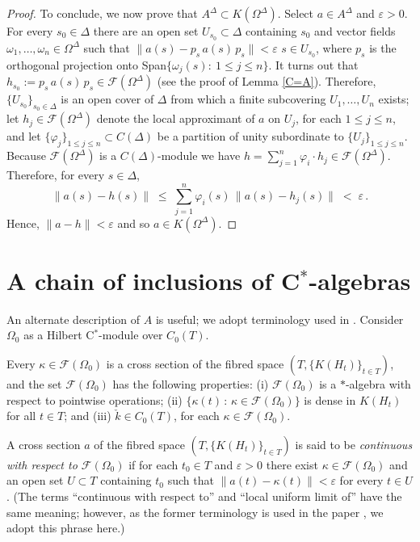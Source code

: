 \documentclass{amsart}
\theoremstyle{definition}
\theoremstyle{remark}
\begin{document}
\begin{proof}
To conclude, we now prove that $A^\Delta\subset K(\Omega^\Delta)$.
Select $a\in A^\Delta$ and $\varepsilon>0$. For every $s_0\in\Delta$ there are an open set $U_{s_0}\subset\Delta$
containing $s_0$ and vector fields $\omega_1,\ldots,\omega_n\in \Omega^\Delta$ such that $\|a(s)-p_s\,a(s)\,p_s\|< \varepsilon$ $s\in U_{s_0}$,
where $p_s$ is the orthogonal projection onto Span$\{\omega_j(s):\ 1\leq j\leq n\}$. It turns out that $h_{s_0}:=p_s\,a(s)\,p_s\in \mathcal F(\Omega^\Delta)$
(see the proof of Lemma \ref{C=A}).
Therefore, $\{U_{s_0}\}_{s_0\in\Delta}$ is an open cover of $\Delta$ from which a finite subcovering $U_1,\dots, U_n$
exists; let $h_j\in  \mathcal F(\Omega^\Delta)$ denote the local approximant of $a$ on $U_j$, for each
$1\leq j\leq n$, and let $\{\varphi_j\}_{1\leq j\leq n}\subset C(\Delta)$ be a partition of unity subordinate to $\{U_j\}_{1\leq j\leq n}$.
Because ${\mathcal{F}}(\Omega^\Delta)$ is a $C(\Delta)$-module
we have $h=\sum_{j=1}^n\varphi_i\cdot h_j\in
\mathcal F(\Omega^\Delta)$. Therefore, for every $s\in\Delta$,
\[
\|a(s)-h(s)\|\;\leq\;\sum_{j=1}^n\varphi_i(s)\,\|a(s)-h_j(s)\|\;<\;\varepsilon\,.
\]
Hence, $\|a-h\|<\varepsilon$ and so $a\in K(\Omega^\Delta)$.
\end{proof}

\section{A chain of inclusions of C$^*$-algebras}\label{sect:chain of inclusions}

An alternate description of $A$ is useful; we adopt terminology used in
\cite{akemann--pedersen--tomiyama1973}.
Consider $\Omega_0$ as a Hilbert C$^*$-module over $C_0(T)$.
 

Every $\kappa\in\mathcal F(\Omega_0)$ is a cross section of the fibred space $(T,\{ K(H_t)\}_{t\in T})$, and the set
$\mathcal F(\Omega_0)$ has the following properties: (i)
$\mathcal F(\Omega_0)$ is a $*$-algebra with respect to pointwise operations; (ii) $\{\kappa(t)\,:\,\kappa\in \mathcal F(\Omega_0)\}$
is dense in $K(H_t)$ for all $t\in T$; and (iii) $\check{k}\in C_0(T)$, for each $\kappa\in \mathcal F(\Omega_0)$.

A cross section $a$ of the fibred space $(T,\{ K(H_t)\}_{t\in T})$ is said to be \emph{continuous with respect to ${\mathcal{F}}(\Omega_0)$} if
for each $t_0\in T$ and $\varepsilon>0$ there exist $\kappa\in {\mathcal{F}}(\Omega_0)$ and an open set $U\subset T$ containing $t_0$
such that $\|a(t)-\kappa(t)\|< \varepsilon$ for every $t\in U$ .
(The terms ``continuous with respect to'' and ``local uniform limit of'' have the same meaning; however, as
the former terminology is used in the paper \cite{akemann--pedersen--tomiyama1973}, we adopt this
phrase here.)
\end{document}
